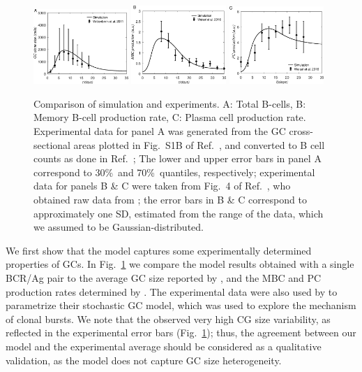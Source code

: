 \documentclass[utf8]{frontiersHLTH}%
\newcommand{\vo}[1]{#1} %
\newcommand{\fig}[1]{Fig.~\ref{fig:#1}}
\newcommand{\hfig}[1]{#1} %
\begin{document}
\hfig{
\begin{figure}
\centering
\includegraphics[width=0.32\textwidth]{../fig3/gcsize.eps}
\includegraphics[width=0.32\textwidth]{../fig3/dmbc.eps}
\includegraphics[width=0.32\textwidth]{../fig3/dplc.eps}
\caption{Comparison of simulation and experiments.
A: Total B-cells, B: Memory B-cell production rate, C: Plasma cell
production rate. Experimental data for panel A was generated from the GC
cross-sectional areas plotted in Fig.~S1B of Ref.~\citenum{wittenbrink11}, and converted to B cell counts
as done in Ref.~\citenum{pelissier20}; \vo{The lower and upper error bars in panel A
correspond to 30\%~and 70\%~quantiles, respectively};
experimental data for panels B \& C were taken from Fig.~4 of Ref.~\citenum{pelissier20}, who
obtained raw data from \citet{weisel16}; the error bars in B \& C correspond to approximately one SD, estimated from the 
range of the data, which we assumed to be Gaussian-distributed.
}
\label{fig:valid}
\end{figure}
}

We first show that the model captures some experimentally determined
properties of GCs. In \fig{valid} we compare the model results obtained
with a single BCR/Ag pair to the average GC size reported by
\citet{wittenbrink11}, and the MBC and PC production rates determined by
\citet{weisel16}. The experimental data were also used by \citet{pelissier20}
to parametrize their stochastic GC model, which was used to explore the
mechanism of clonal bursts.
We note that the
\citet{wittenbrink11} observed very high CG size variability, as
reflected in the experimental error bars (\fig{valid}); thus, the
agreement between our model and the experimental average should be
considered as a qualitative validation, as the model does not capture GC size heterogeneity.
\end{document}
